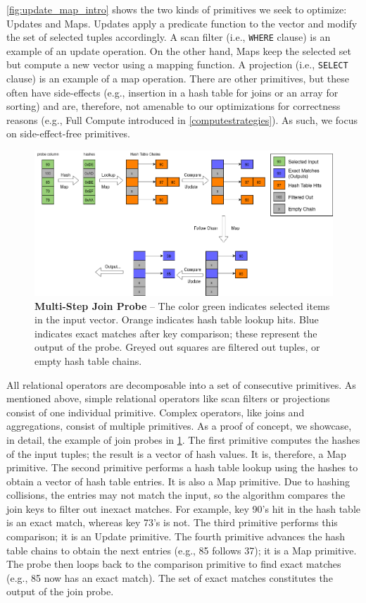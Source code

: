 \documentclass[12pt]{cmuthesis}
\begin{document}
\cref{fig:update_map_intro} shows the two kinds of primitives we seek to optimize: Updates and Maps. Updates apply a predicate function to the vector and modify the set of selected tuples accordingly. A scan filter (i.e., \texttt{WHERE} clause) is an example of an update operation. On the other hand, Maps keep the selected set but compute a new vector using a mapping function. A projection (i.e., \texttt{SELECT} clause) is an example of a map operation. There are other primitives, but these often have side-effects (e.g., insertion in a hash table for joins or an array for sorting) and are, therefore, not amenable to our optimizations for correctness reasons (e.g., Full Compute introduced in \cref{computestrategies}). As such, we focus on side-effect-free primitives.

\begin{figure}[t!]
    \centering
    \includegraphics[scale=0.45]{images/NewJoinProbeExample.png}
    \caption{\textbf{Multi-Step Join Probe} -- The color green indicates selected items in the input vector. Orange indicates hash table lookup hits. Blue indicates exact matches after key comparison; these represent the output of the probe. Greyed out squares are filtered out tuples, or empty hash table chains.}
    \label{fig:probe_example}
\end{figure}
All relational operators are decomposable into a set of consecutive primitives. As mentioned above, simple relational operators like scan filters or projections consist of one individual primitive. Complex operators, like joins and aggregations, consist of multiple primitives. As a proof of concept, we showcase, in detail, the example of join probes in \cref{fig:probe_example}. The first primitive computes the hashes of the input tuples; the result is a vector of hash values. It is, therefore, a Map primitive. The second primitive performs a hash table lookup using the hashes to obtain a vector of hash table entries. It is also a Map primitive. Due to hashing collisions, the entries may not match the input, so the algorithm compares the join keys to filter out inexact matches. For example, key 90's hit in the hash table is an exact match, whereas key 73's is not. The third primitive performs this comparison; it is an Update primitive. The fourth primitive advances the hash table chains to obtain the next entries (e.g., 85 follows 37); it is a Map primitive. The probe then loops back to the comparison primitive to find exact matches (e.g., 85 now has an exact match). The set of exact matches constitutes the output of the join probe.
\end{document}
